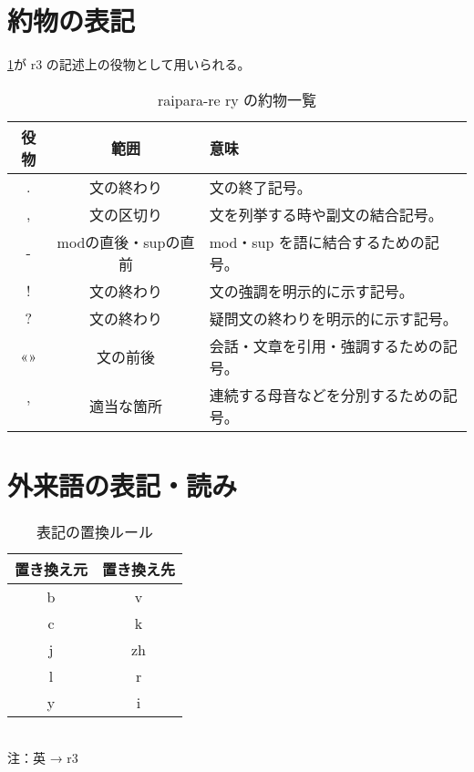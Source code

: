 \section{約物の表記}

\cref{table:list-of-punctuation}が r3 の記述上の役物として用いられる。

\begin{table}[H]
    \centering
    \caption{raipara-re ry の約物一覧}
    \label{table:list-of-punctuation}
    \begin{tabular}{ccl}
        \toprule
        役物 & 範囲 & 意味 \\
        \midrule
        .  & 文の終わり & 文の終了記号。 \\
        ,  & 文の区切り & 文を列挙する時や副文の結合記号。 \\
        -  & modの直後・supの直前 & mod・sup を語に結合するための記号。 \\
        !  & 文の終わり & 文の強調を明示的に示す記号。 \\
        ?  & 文の終わり & 疑問文の終わりを明示的に示す記号。 \\
        «» & 文の前後  & 会話・文章を引用・強調するための記号。 \\
        '  & 適当な箇所 & 連続する母音などを分別するための記号。 \\
        \bottomrule
    \end{tabular}
\end{table}

\section{外来語の表記・読み}

\begin{wraptable}[9]{r}{50mm}
    \centering
    \caption{表記の置換ルール}
    \label{table:r3-rewrite}

    \begin{tabular}{cc}
        \toprule
            置き換え元 & 置き換え先 \\
        \midrule
            b & v \\
            c & k \\
            j & zh \\
            l & r \\
            y & i \\
        \bottomrule
    \end{tabular} \\
    注：英 → r3
\end{wraptable}

